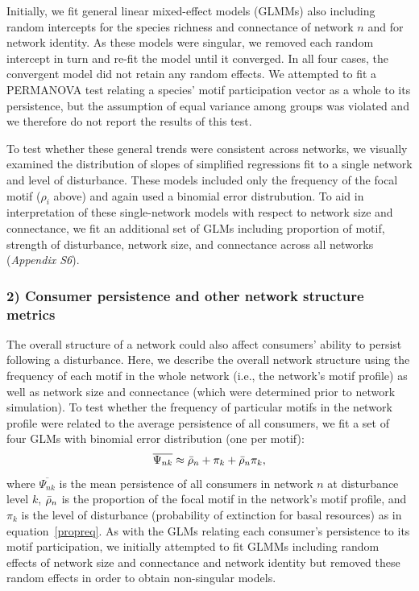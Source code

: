 \documentclass[12pt]{article}
\begin{document}
\begin{spacing}{2.0}
            
            
            Initially, we fit general linear mixed-effect models (GLMMs) also including random  intercepts for the species richness and connectance of network $n$ and for network identity.
            As these models were singular, we removed each random intercept in turn and re-fit the model until it converged.
            In all four cases, the convergent model did not retain any random effects.
            We attempted to fit a PERMANOVA test relating a species' motif participation vector as a whole to its persistence, but the assumption of equal variance among groups was violated and we therefore do not report the results of this test.
            
            
            To test whether these general trends were consistent across networks, we visually examined the distribution of slopes of simplified regressions fit to a single network and level of disturbance.
            These models included only the frequency of the focal motif ($\rho_{i}$ above) and again used a binomial error distrubution.
            To aid in interpretation of these single-network models with respect to network size and connectance, we fit an additional set of GLMs including proportion of motif, strength of disturbance, network size, and connectance across all networks (\emph{Appendix S6}).



        \subsubsection*{2) Consumer persistence and other network structure metrics}

            The overall structure of a network could also affect consumers' ability to persist following a disturbance.
            Here, we describe the overall network structure using the frequency of each motif in the whole network (i.e., the network's motif profile) as well as network size and connectance (which were determined prior to network simulation).
            To test whether the frequency of particular motifs in the network profile were related to the average persistence of all consumers, we fit a set of four GLMs with binomial error distribution (one per motif):
                \begin{equation}
                    \overline{\Psi_{nk}} \approx \Bar{\rho}_{n} + \pi_{k} + \Bar{\rho}_{n}\pi_{k},
                    \label{netpropeq}
                \end{equation}
            \noindent where $\overline{\Psi_{nk}}$ is the mean persistence of all consumers in network $n$ at disturbance level $k$, $\Bar{\rho}_{n}$ is the proportion of the focal motif in the network's motif profile, and $\pi_k$ is the level of disturbance (probability of extinction for basal resources) as in equation~\ref{propreq}.
            As with the GLMs relating each consumer's persistence to its motif participation, we initially attempted to fit GLMMs including random effects of network size and connectance and network identity but removed these random effects in order to obtain non-singular models.



\end{spacing}
\end{document}
